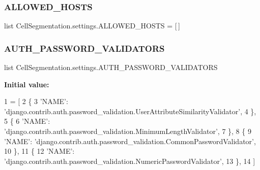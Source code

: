 \subsubsection{\texorpdfstring{A\+L\+L\+O\+W\+E\+D\+\_\+\+H\+O\+S\+TS}{ALLOWED\_HOSTS}}
{\footnotesize\ttfamily list Cell\+Segmentation.\+settings.\+A\+L\+L\+O\+W\+E\+D\+\_\+\+H\+O\+S\+TS = \mbox{[}$\,$\mbox{]}}

\mbox{\label{namespace_cell_segmentation_1_1settings_afdd5aa49192f7f532c0854062f6e2d16}} 
\subsubsection{\texorpdfstring{A\+U\+T\+H\+\_\+\+P\+A\+S\+S\+W\+O\+R\+D\+\_\+\+V\+A\+L\+I\+D\+A\+T\+O\+RS}{AUTH\_PASSWORD\_VALIDATORS}}
{\footnotesize\ttfamily list Cell\+Segmentation.\+settings.\+A\+U\+T\+H\+\_\+\+P\+A\+S\+S\+W\+O\+R\+D\+\_\+\+V\+A\+L\+I\+D\+A\+T\+O\+RS}

{\bfseries Initial value\+:}
\begin{DoxyCode}
1 =  [
2     \{
3         \textcolor{stringliteral}{'NAME'}: \textcolor{stringliteral}{'django.contrib.auth.password\_validation.UserAttributeSimilarityValidator'},
4     \},
5     \{
6         \textcolor{stringliteral}{'NAME'}: \textcolor{stringliteral}{'django.contrib.auth.password\_validation.MinimumLengthValidator'},
7     \},
8     \{
9         \textcolor{stringliteral}{'NAME'}: \textcolor{stringliteral}{'django.contrib.auth.password\_validation.CommonPasswordValidator'},
10     \},
11     \{
12         \textcolor{stringliteral}{'NAME'}: \textcolor{stringliteral}{'django.contrib.auth.password\_validation.NumericPasswordValidator'},
13     \},
14 ]
\end{DoxyCode}
\mbox{\label{namespace_cell_segmentation_1_1settings_a354c3e9bde5b55650a0e821028acf8c2}} 
